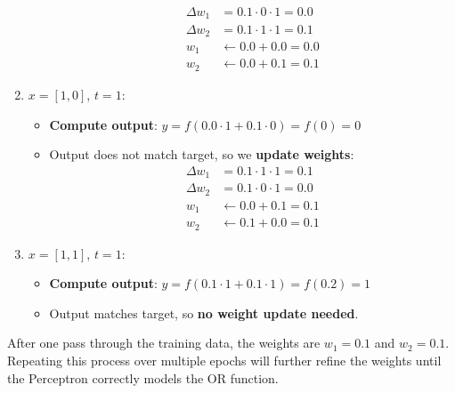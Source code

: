 \begin{examplebox}
\begin{enumerate}
\begin{itemize}
            \begin{align*}
                \Delta w_1 & = 0.1 \cdot 0 \cdot 1 = 0.0 \\
                \Delta w_2 & = 0.1 \cdot 1 \cdot 1 = 0.1 \\
                w_1 & \leftarrow 0.0 + 0.0 = 0.0 \\
                w_2 & \leftarrow 0.0 + 0.1 = 0.1
            \end{align*}
        \end{itemize}
        \item {} $x = [1, 0]$, $t = 1$:
        \begin{itemize}
            \item[\faIcon{cogs}] \textbf{Compute output}: $y = f(0.0 \cdot 1 + 0.1 \cdot 0) = f(0) = 0$
            \item[\textcolor{Red2}{\faIcon{times-circle}}] Output does not match target, so we \textbf{update weights}:
            \begin{align*}
                \Delta w_1 & = 0.1 \cdot 1 \cdot 1 = 0.1 \\
                \Delta w_2 & = 0.1 \cdot 0 \cdot 1 = 0.0 \\
                w_1 & \leftarrow 0.0 + 0.1 = 0.1 \\
                w_2 & \leftarrow 0.1 + 0.0 = 0.1
            \end{align*}
        \end{itemize}
        \item {} $x = [1, 1]$, $t = 1$:
        \begin{itemize}
            \item[\faIcon{cogs}] \textbf{Compute output}: $y = f(0.1 \cdot 1 + 0.1 \cdot 1) = f(0.2) = 1$
            \item[\textcolor{Green3}{\faIcon{check-circle}}] Output matches target, so \textbf{no weight update needed}.
        \end{itemize}
    \end{enumerate}
    After one pass through the training data, the weights are $w_1 = 0.1$ and $w_2 = 0.1$. Repeating this process over multiple epochs will further refine the weights until the Perceptron correctly models the OR function.
\end{examplebox}

\newpage

